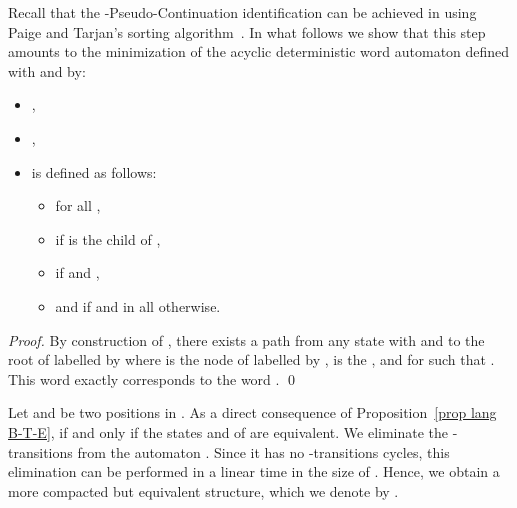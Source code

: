 \documentclass{llncs}
\begin{document}
Recall that the -Pseudo-Continuation identification can be achieved in  \cite{ZPC2,automate2} using Paige and Tarjan's sorting algorithm~\cite{tarjan}. In what follows we show that this step amounts to the minimization of the acyclic deterministic word automaton  defined  with  and  by: 
\begin{itemize}
\item ,
\item ,
\item  is defined as follows:
	\begin{itemize}
	\item  for all  ,
	\item  if  is the  child of ,
	\item  if  and ,
	\item  and if  and  in all otherwise.  
	 \end{itemize}
\end{itemize}     

\begin{proposition}\label{prop lang B-T-E}

\end{proposition}
\begin{proof}
  By construction of , there exists a path from any state  with  and  to the root of  labelled by  where  is the node of  labelled by ,  is the ,  and for  such that . This word exactly corresponds to the word .
 \qed
\end{proof} 

Let  and  be two positions in .  As a direct consequence of Proposition~\ref{prop lang B-T-E},  if and only if the states  and  of  are equivalent. We eliminate the -transitions from the automaton . Since it has no -transitions cycles, this elimination can be performed in a linear time in the size of . Hence, we obtain a more compacted but equivalent structure, which we denote by .
\end{document}
